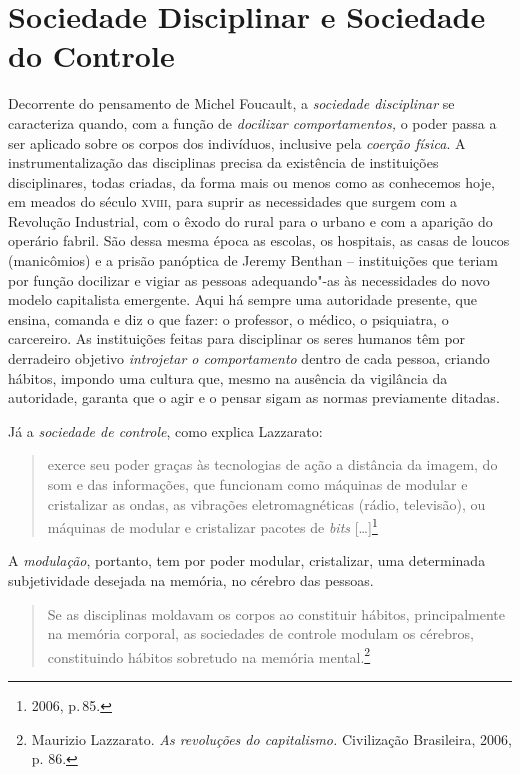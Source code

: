\section{Sociedade Disciplinar e Sociedade do Controle}

Decorrente do pensamento de Michel Foucault, a \emph{sociedade
disciplinar} se caracteriza quando, com a função de \emph{docilizar
comportamentos,} o poder passa a ser aplicado sobre os corpos dos
indivíduos, inclusive pela \emph{coerção física}. A instrumentalização
das disciplinas precisa da existência de instituições disciplinares,
todas criadas, da forma mais ou menos como as conhecemos hoje, em meados
do século \textsc{xviii}, para suprir as necessidades que surgem com a Revolução
Industrial, com o êxodo do rural para o urbano e com a aparição do
operário fabril. São dessa mesma época as escolas, os hospitais, as
casas de loucos (manicômios) e a prisão panóptica de Jeremy Benthan --
instituições que teriam por função docilizar e vigiar as pessoas
adequando"-as às necessidades do novo modelo capitalista emergente. Aqui
há sempre uma autoridade presente, que ensina, comanda e diz o que
fazer: o professor, o médico, o psiquiatra, o carcereiro. As
instituições feitas para disciplinar os seres humanos têm por derradeiro
objetivo \emph{introjetar o comportamento} dentro de cada pessoa,
criando hábitos, impondo uma cultura que, mesmo na ausência da
vigilância da autoridade, garanta que o agir e o pensar sigam as normas
previamente ditadas.

Já a \emph{sociedade de controle}, como explica Lazzarato:

\begin{quote}
exerce seu poder graças às tecnologias de ação a distância da imagem, do
som e das informações, que funcionam como máquinas de modular e
cristalizar as ondas, as vibrações eletromagnéticas (rádio, televisão),
ou máquinas de modular e cristalizar pacotes de \emph{bits} {[}\ldots{}{]}\footnote{2006, p.\,85.}
\end{quote}

A \emph{modulação}, portanto, tem por poder modular, cristalizar, uma
determinada subjetividade desejada na memória, no cérebro das pessoas.

\begin{quote}
Se as disciplinas moldavam os corpos ao constituir hábitos,
principalmente na memória corporal, as sociedades de controle modulam os
cérebros, constituindo hábitos sobretudo na memória mental.\footnote{Maurizio Lazzarato. \emph{As revoluções do capitalismo.} Civilização Brasileira, 2006, p. 86.}
\end{quote}

